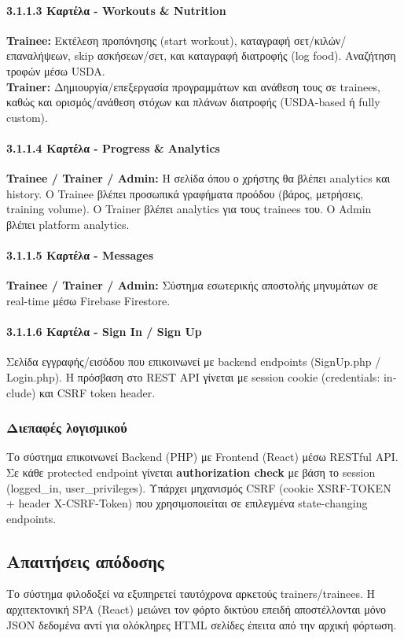 \documentclass[12pt,a4paper]{report}
\begin{document}
\paragraph{3.1.1.3 Καρτέλα - Workouts \& Nutrition}
\textbf{Trainee:} Εκτέλεση προπόνησης (start workout), καταγραφή σετ/κιλών/επαναλήψεων, \textenglish{skip} ασκήσεων/σετ, και καταγραφή διατροφής (log food). Αναζήτηση τροφών μέσω USDA. \\
\textbf{Trainer:} Δημιουργία/επεξεργασία προγραμμάτων και ανάθεση τους σε trainees, καθώς και ορισμός/ανάθεση στόχων και πλάνων διατροφής (USDA-based ή fully custom).

\paragraph{3.1.1.4 Καρτέλα - Progress \& Analytics}
\textbf{Trainee / Trainer / Admin:} Η σελίδα όπου ο χρήστης θα βλέπει analytics και history. Ο Trainee βλέπει προσωπικά γραφήματα προόδου (βάρος, μετρήσεις, training volume). Ο Trainer βλέπει analytics για τους trainees του. Ο Admin βλέπει platform analytics.

\paragraph{3.1.1.5 Καρτέλα - Messages}
\textbf{Trainee / Trainer / Admin:} Σύστημα εσωτερικής αποστολής μηνυμάτων σε real-time μέσω Firebase Firestore.

\paragraph{3.1.1.6 Καρτέλα - Sign In / Sign Up}
Σελίδα εγγραφής/εισόδου που επικοινωνεί με backend endpoints (\textenglish{SignUp.php / Login.php}). Η πρόσβαση στο REST API γίνεται με session cookie (\textenglish{credentials: include}) και CSRF token header.

\subsubsection{Διεπαφές λογισμικού}
Το σύστημα επικοινωνεί Backend (PHP) με Frontend (React) μέσω RESTful API. Σε κάθε protected endpoint γίνεται \textbf{authorization check} με βάση το session (\textenglish{logged\_in, user\_privileges}). Υπάρχει μηχανισμός CSRF (cookie \textenglish{XSRF-TOKEN} + header \textenglish{X-CSRF-Token}) που χρησιμοποιείται σε επιλεγμένα state-changing endpoints.

\subsection{Απαιτήσεις απόδοσης}
Το σύστημα φιλοδοξεί να εξυπηρετεί ταυτόχρονα αρκετούς trainers/trainees. Η αρχιτεκτονική SPA (React) μειώνει τον φόρτο δικτύου επειδή αποστέλλονται μόνο JSON δεδομένα αντί για ολόκληρες HTML σελίδες έπειτα από την αρχική φόρτωση. 
\end{document}
